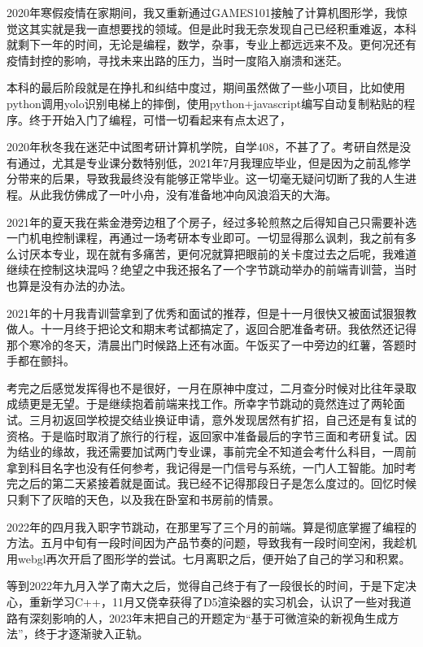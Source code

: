 
2020年寒假疫情在家期间，我又重新通过GAMES101接触了计算机图形学，我惊觉这其实就是我一直想要找的领域。但是此时我无奈发现自己已经积重难返，本科就剩下一年的时间，无论是编程，数学，杂事，专业上都远远来不及。更何况还有疫情封控的影响，寻找未来出路的压力，当时一度陷入崩溃和迷茫。

本科的最后阶段就是在挣扎和纠结中度过，期间虽然做了一些小项目，比如使用python调用yolo识别电梯上的摔倒，使用python+javascript编写自动复制粘贴的程序。终于开始入门了编程，可惜一切看起来有点太迟了，

2020年秋冬我在迷茫中试图考研计算机学院，自学408，不甚了了。考研自然是没有通过，尤其是专业课分数特别低，2021年7月我理应毕业，但是因为之前乱修学分带来的后果，导致我最终没有能够正常毕业。这一切毫无疑问切断了我的人生进程。从此我仿佛成了一叶小舟，没有准备地冲向风浪滔天的大海。

2021年的夏天我在紫金港旁边租了个房子，经过多轮煎熬之后得知自己只需要补选一门机电控制课程，再通过一场考研本专业即可。一切显得那么讽刺，我之前有多么讨厌本专业，现在就有多痛苦，更何况就算把眼前的关卡度过去之后呢，我难道继续在控制这块混吗？绝望之中我还报名了一个字节跳动举办的前端青训营，当时也算是没有办法的办法。

2021年的十月我青训营拿到了优秀和面试的推荐，但是十一月很快又被面试狠狠教做人。十一月终于把论文和期末考试都搞定了，返回合肥准备考研。我依然还记得那个寒冷的冬天，清晨出门时候路上还有冰面。午饭买了一中旁边的红薯，答题时手都在颤抖。

考完之后感觉发挥得也不是很好，一月在原神中度过，二月查分时候对比往年录取成绩更是无望。于是继续抱着前端来找工作。所幸字节跳动的竟然连过了两轮面试。三月初返回学校提交结业换证申请，意外发现居然有扩招，自己还是有复试的资格。于是临时取消了旅行的行程，返回家中准备最后的字节三面和考研复试。因为结业的缘故，我还需要加试两门专业课，事前完全不知道会考什么科目，一周前拿到科目名字也没有任何参考，我记得是一门信号与系统，一门人工智能。加时考完之后的第二天紧接着就是面试。我已经不记得那段日子是怎么度过的。回忆时候只剩下了灰暗的天色，以及我在卧室和书房前的情景。

2022年的四月我入职字节跳动，在那里写了三个月的前端。算是彻底掌握了编程的方法。五月中旬有一段时间因为产品节奏的问题，导致我有一段时间空闲，我趁机用webgl再次开启了图形学的尝试。七月离职之后，便开始了自己的学习和积累。

等到2022年九月入学了南大之后，觉得自己终于有了一段很长的时间，于是下定决心，重新学习C++，11月又侥幸获得了D5渲染器的实习机会，认识了一些对我道路有深刻影响的人，2023年末把自己的开题定为“基于可微渲染的新视角生成方法”，终于才逐渐驶入正轨。
